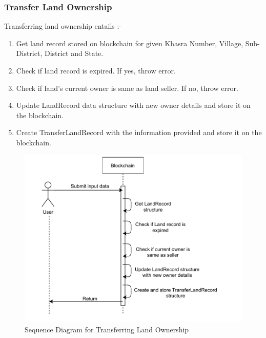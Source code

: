 \documentclass{article}
\begin{document}
    \subsubsection{Transfer Land Ownership}
        Transferring land ownership entails :-
        \begin{enumerate}
            \item Get land record stored on blockchain for given Khasra Number, Village, Sub-District, District and State.
            \item Check if land record is expired. If yes, throw error.
            \item Check if land's current owner is same as land seller. If no, throw error.
            \item Update LandRecord data structure with new owner details and store it on the blockchain.
            \item Create TransferLandRecord with the information provided and store it on the blockchain.
        \end{enumerate}

        \begin{figure}[htbp]
            \includegraphics[scale=0.25]{blockchain_seq_transfer_land}
            \centering
            \caption{Sequence Diagram for Transferring Land Ownership}
        \end{figure}
\end{document}
